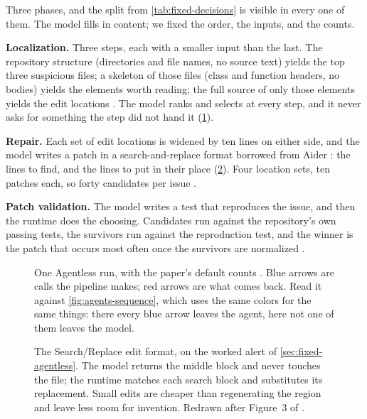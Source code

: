 Three phases, and the split from \cref{tab:fixed-decisions} is visible in every one of them. The
model fills in content; we fixed the order, the inputs, and the counts.

\bi

\item \textbf{Localization.} Three steps, each with a smaller input than the last. The repository
structure (directories and file names, no source text) yields the top three suspicious files; a
skeleton of those files (class and function headers, no bodies) yields the elements worth reading;
the full source of only those elements yields the edit locations \citep[\S3.1]{xia2025agentless}.
The model ranks and selects at every step, and it never asks for something the step did not hand
it (\cref{fig:seq-agentless}).

\item \textbf{Repair.} Each set of edit locations is widened by ten lines on either side, and the
model writes a patch in a search-and-replace format borrowed from Aider
\citep{gauthier2024aider}: the lines to find, and the lines to put in their place
(\cref{fig:search-replace}). Four location
sets, ten patches each, so forty candidates per issue \citep[\S3.2, \S4]{xia2025agentless}.

\item \textbf{Patch validation.} The model writes a test that reproduces the issue, and then the
runtime does the choosing. Candidates run against the repository's own passing tests, the
survivors run against the reproduction test, and the winner is the patch that occurs most often
once the survivors are normalized \citep[\S3.3]{xia2025agentless}.

\ei

\begin{figure}[htbp]
  \centering
  \resizebox{\linewidth}{!}{}
  \caption{One Agentless run, with the paper's default counts \citep[\S3, \S4]{xia2025agentless}.
  Blue arrows are calls the pipeline makes; red arrows are what comes back. Read it against
  \cref{fig:agents-sequence}, which uses the same colors for the same things: there every blue
  arrow leaves the agent, here not one of them leaves the model.}
  \label{fig:seq-agentless}
\end{figure}

\begin{figure}[htbp]
  \centering
  
  \caption{The Search/Replace edit format, on the worked alert of \cref{sec:fixed-agentless}. The model returns
  the middle block and never touches the file; the runtime matches each search block and
  substitutes its replacement. Small edits are cheaper than regenerating the region and leave less
  room for invention. Redrawn after Figure~3 of \citet{xia2025agentless}.}
  \label{fig:search-replace}
\end{figure}

